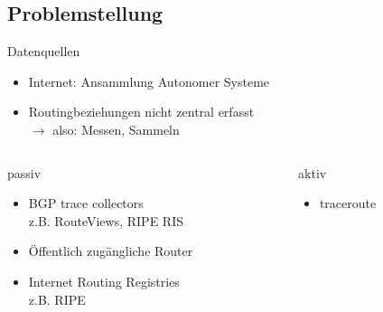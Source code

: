 \documentclass[ngerman,compress,hyperref={bookmarks}]{beamer}
\begin{document}
\subsection{Problemstellung}
\begin{frame}{Datenquellen}
  \begin{itemize}
    \item Internet: Ansammlung Autonomer Systeme
    \item Routingbeziehungen nicht zentral erfasst\\$\rightarrow$ also: Messen, Sammeln
  \end{itemize}

  \begin{columns}[t]
    \begin{column}{0.4\textwidth}
      passiv
      \begin{itemize}
        \item BGP trace collectors\\{\scriptsize z.B. RouteViews, RIPE RIS}
        \item Öffentlich zugängliche Router
        \item Internet Routing Registries\\{\scriptsize z.B. RIPE}
      \end{itemize}
    \end{column}
    \begin{column}{0.4\textwidth}
      aktiv
      \begin{itemize}
        \item traceroute
      \end{itemize}
    \end{column}
  \end{columns}
\end{frame}
\end{document}
